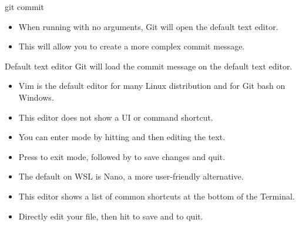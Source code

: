 \begin{frame}[fragile]{git commit}
    \begin{itemize}[<+->]
        \item When running  with no arguments, Git will open the default text editor.
        \item This will allow you to create a more complex commit message.
    \end{itemize}
\end{frame}

\begin{frame}[fragile]{Default text editor}
    Git will load the commit message on the default text editor.


    \begin{itemize}[<+->]
        \item Vim is the default editor for many Linux distribution and for Git bash on Windows.
        \item This editor does not show a UI or command shortcut.
        \item You can enter  mode by hitting  and then editing the text.
        \item Press  to exit  mode, followed by  to save changes and quit.
    \end{itemize}


    \begin{itemize}[<+->]
        \item The default on WSL is Nano, a more user-friendly alternative.
        \item This editor shows a list of common shortcuts at the bottom of the Terminal.
        \item Directly edit your file, then hit  to save and  to quit. 
    \end{itemize}
\end{frame}

